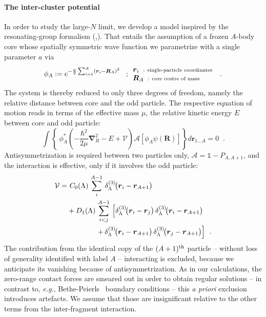 \documentclass
[aps,nofootinbib,prl,showpacs,twocolumn,groupedaddress,superscriptaddress]
{revtex4}
\newcommand{\be}{\begin{equation}}
\newcommand{\ee}{\end{equation}}
\newcommand{\eg}{\textit{e.g.}\;}
\newcommand{\ve}[1]{\ensuremath{\boldsymbol{#1}}}
\newcommand{\ddrei}[1]{\delta_{\tiny \Lambda}^{(3)}\!\big(#1\big)}
\begin{document}
\paragraph{The inter-cluster potential}
In order to study the large-$N$ limit, we develop a model inspired by the resonating-group formalism
(\cite{Wheeler:1937zz},\cite{Wildermuth1977}).
That entails the assumption of a frozen $A$-body core whose spatially symmetric wave function we
parametrize with a single parameter $a$ via
\be\label{eq.rgm.corewfkt}
\phi_A:=e^{-\frac{a}{2}\sum_{i=1}^A\left(\ve{r}_i-\ve{R}_A\right)^2}\;\;\;;
\begin{array}{l}
     \ve{r}_i\;\;\text{\scriptsize : single-particle coordinates}  \\
     \ve{R}_A\;\;\text{\scriptsize : core centre of mass}
\end{array}\;\;.
\ee
The system is thereby reduced to only three degrees of freedom, namely the relative distance
between core and the odd particle. The respective equation of motion reads in terms of the effective
mass $\mu$, the relative kinetic energy $E$ between core and odd particle:
\be\label{eq.rgm.eqom}
\int\left\lbrace~\phi^*_A\left(-\frac{\hbar^2}{2\mu}\ve{\nabla}_R^2-E+\mathcal{V}\right)
\mathcal{A}\left[\phi_A\psi(\ve{R})\right]\right\rbrace d\ve{r}_{1\ldots A}=0\;\;.
\ee
Antisymmetrization is required between two particles only, 
$\mathcal{A}=\mathbb{1}-P_{A,A+1}$, 
and the interaction is effective, only if it involves the odd particle:
\begin{align}
\mathcal{V}=&~C_0(\Lambda)\,\sum_{i}^{A-1}\,\ddrei{\ve{r}_i-\ve{r}_{A+1}}\\
&+D_1(\Lambda)\,\sum^{A-1}_{i<j}\,\left[\ddrei{\ve{r}_i-\ve{r}_j}\,
\ddrei{\ve{r}_i-\ve{r}_{A+1}}\right.\\&\qquad\qquad\left.+
\,\ddrei{\ve{r}_i-\ve{r}_{A+1}}\,
\ddrei{\ve{r}_j-\ve{r}_{A+1}}\right]\;\,.
\end{align}
The contribution from the identical copy of the $(A+1)^\text{\scriptsize th}$ particle
-- without loss of generality identified with label $A$ -- interacting is excluded, 
because we anticipate its vanishing because of antisymmetrization.
As in our calculations, the zero-range contact forces are smeared out in order to 
obtain regular solutions -- in contrast to, \eg,
Bethe-Peierls~\cite{bethePeierls} boundary conditions 
-- this {\it a priori} exclusion introduces artefacts. We assume
that those are insignificant relative to the other terms from 
the inter-fragment interaction.
\end{document}
